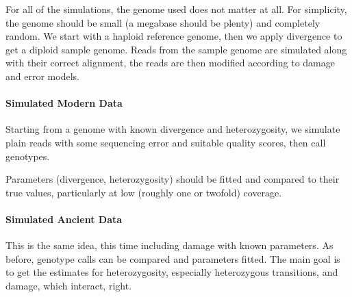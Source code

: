 \documentclass{article}
\begin{document}
For all of the simulations, the genome used does not matter at all.  For
simplicity, the genome should be small (a megabase should be plenty) and
completely random.  We start with a haploid reference genome, then we
apply divergence to get a diploid sample genome.  Reads from the sample
genome are simulated along with their correct alignment, the reads are
then modified according to damage and error models.




\paragraph{Simulated Modern Data}

Starting from a genome with known divergence and heterozygosity, we
simulate plain reads with some sequencing error and suitable quality
scores, then call genotypes.

Parameters (divergence, heterozygosity) should be fitted and compared to
their true values, particularly at low (roughly one or twofold)
coverage.


\paragraph{Simulated Ancient Data}

This is the same idea, this time including damage with known parameters.
As before, genotype calls can be compared and parameters fitted.  The
main goal is to get the estimates for heterozygosity, especially
heterozygous transitions, and damage, which interact, right.
\end{document}
